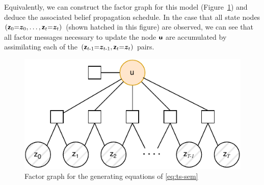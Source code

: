 Equivalently, we can construct the factor graph \citep{KschischangFactor2001,FreyFactor1997} for this model (Figure~\ref{fig:ts_fg}) and deduce the associated belief propagation schedule.
In the case that all state nodes\(\left(\boldsymbol{\mathsf{z}}_{0}{=}\boldsymbol{z}_{0},\dots, \boldsymbol{\mathsf{z}}_{t}{=}\boldsymbol{z}_{t}\right)\) (shown hatched in this figure) are observed, we can see that all factor messages necessary to update the node \(\boldsymbol{\mathsf{u}}\) are accumulated by assimilating each of the \(\left(\boldsymbol{\mathsf{z}}_{t{\operatorname{-}}1}{=}\boldsymbol{z}_{t{\operatorname{-}}1}, \boldsymbol{\mathsf{z}}_{t}{=}\boldsymbol{z}_{t}\right)\) pairs.

\begin{figure}
    \centering
    \includegraphics{FG_ts.drawio.pdf}
    \caption{Factor graph  for the generating equations of \eqref{eq:ts-sem}}
    \label{fig:ts_fg}
\end{figure}

